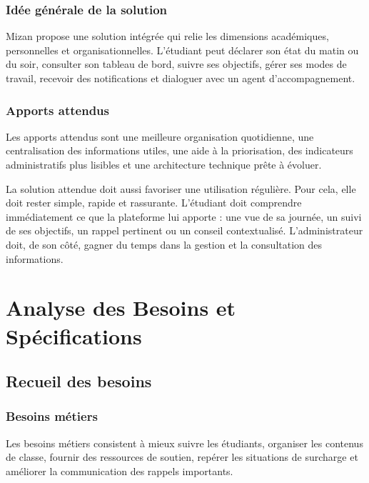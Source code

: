 \documentclass{rapportENSET}
\begin{document}
\subsubsection*{Idée générale de la solution}
Mizan propose une solution intégrée qui relie les dimensions académiques, personnelles et organisationnelles. L'étudiant peut déclarer son état du matin ou du soir, consulter son tableau de bord, suivre ses objectifs, gérer ses modes de travail, recevoir des notifications et dialoguer avec un agent d'accompagnement.

\subsubsection*{Apports attendus}
Les apports attendus sont une meilleure organisation quotidienne, une centralisation des informations utiles, une aide à la priorisation, des indicateurs administratifs plus lisibles et une architecture technique prête à évoluer.

La solution attendue doit aussi favoriser une utilisation régulière. Pour cela, elle doit rester simple, rapide et rassurante. L'étudiant doit comprendre immédiatement ce que la plateforme lui apporte : une vue de sa journée, un suivi de ses objectifs, un rappel pertinent ou un conseil contextualisé. L'administrateur doit, de son côté, gagner du temps dans la gestion et la consultation des informations.


\section{Analyse des Besoins et Spécifications}
\subsection{Recueil des besoins}
\subsubsection*{Besoins métiers}
Les besoins métiers consistent à mieux suivre les étudiants, organiser les contenus de classe, fournir des ressources de soutien, repérer les situations de surcharge et améliorer la communication des rappels importants.
\end{document}
